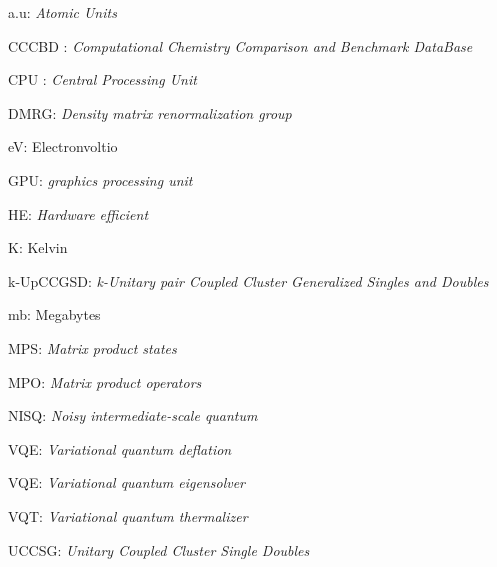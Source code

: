 

{\setlength{\parskip}{0cm} %

a.u: \textit{Atomic Units}

CCCBD : \textit{Computational Chemistry Comparison and Benchmark DataBase}

CPU : \textit{Central Processing Unit}

DMRG: \textit{Density matrix renormalization group}

eV: Electronvoltio

GPU: \textit{graphics processing unit}

HE: \textit{Hardware efficient}

K: Kelvin

k-UpCCGSD: \textit{k-Unitary pair Coupled Cluster Generalized Singles and Doubles} 

mb: Megabytes

MPS: \textit{Matrix product states}

MPO: \textit{Matrix product operators}

NISQ: \textit{Noisy intermediate-scale quantum}

VQE: \textit{Variational quantum deflation}

VQE: \textit{Variational quantum eigensolver}

VQT: \textit{Variational quantum thermalizer}

UCCSG: \textit{Unitary Coupled Cluster Single Doubles}


}

